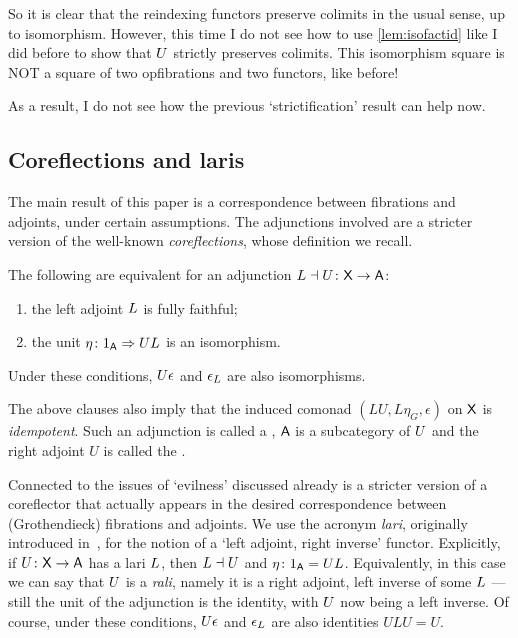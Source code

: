 \documentclass{amsart}
\begin{document}
So it is clear that the reindexing functors preserve colimits in the usual sense, up to isomorphism. However, this time I do not see how to use \cref{lem:isofactid} like I did before to show that $U$ strictly preserves colimits. This isomorphism square is NOT a square of two opfibrations and two functors, like before!

As a result, I do not see how the previous `strictification' result can help now.


\subsection*{Coreflections and laris}

The main result of this paper is a correspondence between fibrations and adjoints, under certain assumptions. The adjunctions involved are a stricter version of the well-known \emph{coreflections}, whose definition we recall. %

\begin{prop}\label{prop:coreflection}
The following are equivalent for an adjunction $L\dashv U\colon\mathsf{X}\to\mathsf{A}$:
 \begin{enumerate}
  \item the left adjoint $L$ is fully faithful;
  \item the unit $\eta\colon1_{\mathsf{A}}\Rightarrow UL$ is an isomorphism.
 \end{enumerate}
Under these conditions, $U\epsilon$ and $\epsilon_L$ are also isomorphisms.
\end{prop}

The above clauses also imply that the induced comonad $(LU,L\eta_G,\epsilon)$ on $\mathsf{X}$ is \emph{idempotent}. Such an adjunction is called a , $\mathsf{A}$ is a  subcategory of $U$ and the right adjoint $U$ is called the .

Connected to the issues of `evilness' discussed already is a stricter version of a coreflector that actually appears in the desired correspondence between (Gro\-the\-ndi\-eck) fibrations and adjoints.
We use the acronym \emph{lari}, originally introduced in~\cite{Grayfibredandcofibred}, for the notion of a `left adjoint, right inverse' functor. Explicitly, if $U\colon\mathsf{X}\to\mathsf{A}$ has a lari $L$, then $L\dashv U$ and $\eta\colon1_{\mathsf{A}}=UL$. Equivalently, in this case we can say that $U$ is a \emph{rali}, namely it is a right adjoint, left inverse of some $L$ --- still the unit of the adjunction is the identity, with $U$ now being a left inverse. Of course, under these conditions, $U\epsilon$ and $\epsilon_L$ are also identities $ULU=U$.
\end{document}
